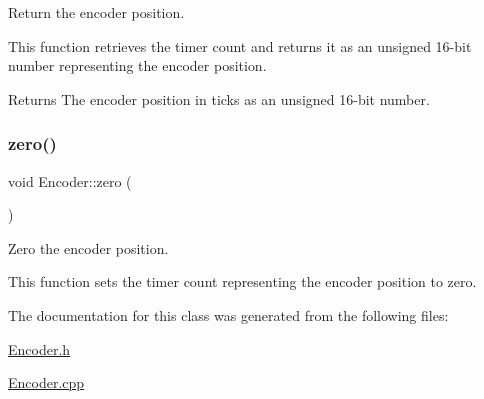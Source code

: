 Return the encoder position. 

This function retrieves the timer count and returns it as an unsigned 16-\/bit number representing the encoder position. \begin{DoxyReturn}{Returns}
The encoder position in ticks as an unsigned 16-\/bit number. 
\end{DoxyReturn}
\mbox{\label{class_encoder_a0d3bf72860cbdc4cd62ed0019a3c8aef}} 
\subsubsection{\texorpdfstring{zero()}{zero()}}
{\footnotesize\ttfamily void Encoder\+::zero (\begin{DoxyParamCaption}{ }\end{DoxyParamCaption})}



Zero the encoder position. 

This function sets the timer count representing the encoder position to zero. 

The documentation for this class was generated from the following files\+:\begin{DoxyCompactItemize}
\item 
\mbox{\hyperlink{_encoder_8h}{Encoder.\+h}}\item 
\mbox{\hyperlink{_encoder_8cpp}{Encoder.\+cpp}}\end{DoxyCompactItemize}
